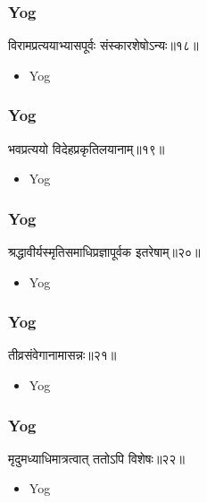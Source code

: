 \begin{frame}[fragile]\frametitle{Yog}
\begin{sanskrit}
विरामप्रत्ययाभ्यासपूर्वः संस्कारशेषोऽन्यः॥१८॥
\end{sanskrit}
	\begin{itemize}
	\item Yog 
	\end{itemize}
\end{frame}


\begin{frame}[fragile]\frametitle{Yog}
\begin{sanskrit}
भवप्रत्ययो विदेहप्रकृतिलयानाम्॥१९॥
\end{sanskrit}
	\begin{itemize}
	\item Yog 
	\end{itemize}
\end{frame}

\begin{frame}[fragile]\frametitle{Yog}
\begin{sanskrit}
श्रद्धावीर्यस्मृतिसमाधिप्रज्ञापूर्वक इतरेषाम्॥२०॥
\end{sanskrit}
	\begin{itemize}
	\item Yog 
	\end{itemize}
\end{frame}

\begin{frame}[fragile]\frametitle{Yog}
\begin{sanskrit}
तीव्रसंवेगानामासन्नः॥२१॥
\end{sanskrit}
	\begin{itemize}
	\item Yog 
	\end{itemize}
\end{frame}


\begin{frame}[fragile]\frametitle{Yog}
\begin{sanskrit}
मृदुमध्याधिमात्रत्वात् ततोऽपि विशेषः॥२२॥
\end{sanskrit}
	\begin{itemize}
	\item Yog 
	\end{itemize}
\end{frame}


